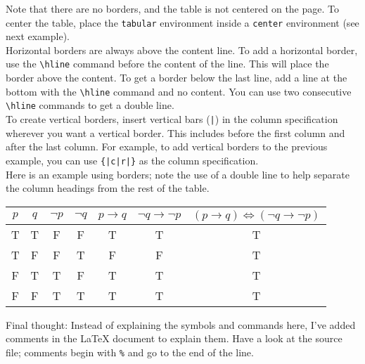 \documentclass{article}
\begin{document}
Note that there are no borders, and the table is not centered on the page. To
center the table, place the {\tt tabular} environment inside a {\tt center}
environment (see next example).\\

Horizontal borders are always above the content line. To add a horizontal
border, use the {\tt \textbackslash hline} command before the content of the
line. This will place the border above the content. To get a border below the
last line, add a line at the bottom with the {\tt \textbackslash hline} command
and no content. You can use two consecutive {\tt \textbackslash hline} commands
to get a double line.\\

To create vertical borders, insert vertical bars ({\tt |}) in the column
specification wherever you want a vertical border. This includes before the
first column and after the last column. For example, to add vertical borders to
the previous example, you can use {\tt \{|c|r|\}} as the column specification.\\

Here is an example using borders; note the use of a double line to help separate
the column headings from the rest of the table.\\

\begin{center} %
  \begin{tabular}{|c|c|c|c|c|c|c|} %
    \hline %
    $p$ & $q$ & $\lnot p$ & $\lnot q$ & $p\to q$ & $\lnot q\to \lnot p$ &
    $(p\to q)\iff(\lnot q\to\lnot p)$\\ \hline\hline %
    T & T & F & F & T & T & T\\ \hline %
    T & F & F & T & F & F & T\\ \hline
    F & T & T & F & T & T & T\\ \hline
    F & F & T & T & T & T & T\\ \hline %
  \end{tabular}
\end{center}
\vskip12pt

Final thought: Instead of explaining the symbols and commands here, I've added
comments in the \LaTeX{} document to explain them. Have a look at the source
file; comments begin with {\tt \%} and go to the end of the line.
\end{document}
